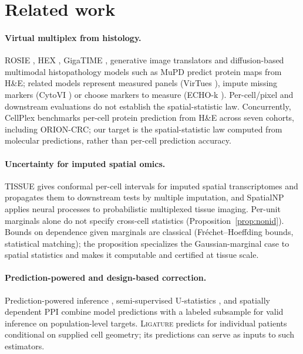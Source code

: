 \documentclass[10pt,letterpaper]{article}
\theoremstyle{definition}
\theoremstyle{remark}
\newcommand{\method}{\textnormal{\textsc{Ligature}}}
\begin{document}
\section{Related work}

\paragraph{Virtual multiplex from histology.} ROSIE \citep{rosie2025}, HEX \citep{hex2026}, GigaTIME \citep{gigatime2025}, generative image translators \citep{virtualmultiplexer} and diffusion-based multimodal histopathology models such as MuPD \citep{mupd2026} predict protein maps from H\&E; related models represent measured panels (VirTues \citep{virtues2026}), impute missing markers (CytoVI \citep{cytovi2026}) or choose markers to measure (ECHO-k \citep{echok2026}). Per-cell/pixel and downstream evaluations do not establish the spatial-statistic law. Concurrently, CellPlex \citep{cellplex2026} benchmarks per-cell protein prediction from H\&E across seven cohorts, including ORION-CRC; our target is the spatial-statistic law computed from molecular predictions, rather than per-cell prediction accuracy.

\paragraph{Uncertainty for imputed spatial omics.} TISSUE \citep{tissue2024} gives conformal per-cell intervals for imputed spatial transcriptomes and propagates them to downstream tests by multiple imputation, and SpatialNP \citep{spatialnp2026} applies neural processes to probabilistic multiplexed tissue imaging. Per-unit marginals alone do not specify cross-cell statistics (Proposition~\ref{prop:nonid}). Bounds on dependence given marginals are classical (Fr\'echet--Hoeffding bounds, statistical matching); the proposition specializes the Gaussian-marginal case to spatial statistics and makes it computable and certified at tissue scale.

\paragraph{Prediction-powered and design-based correction.} Prediction-powered inference \citep{ppi2023,activeinference2024}, semi-supervised U-statistics \citep{kim2024ssu}, and spatially dependent PPI \citep{ppispatial2026} combine model predictions with a labeled subsample for valid inference on population-level targets. \method{} predicts for individual patients conditional on supplied cell geometry; its predictions can serve as inputs to such estimators.
\end{document}
